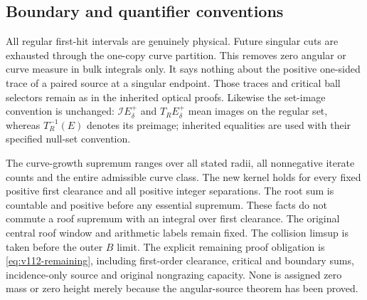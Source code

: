 \subsection*{Boundary and quantifier conventions}
All regular first-hit intervals are genuinely physical. Future
singular cuts are exhausted through the one-copy curve partition.
This removes zero angular or curve measure in bulk integrals only.
It says nothing about the positive one-sided trace of a paired
source at a singular endpoint. Those traces and critical ball
selectors remain as in the inherited optical proofs. Likewise the
set-image convention is unchanged: $\mathcal I E_\delta^+$ and
$T_RE_\delta^+$ mean images on the regular set, whereas
$T_R^{-1}(E)$ denotes its preimage; inherited equalities are used
with their specified null-set convention.

The curve-growth supremum ranges over all stated radii, all
nonnegative iterate counts and the entire admissible curve class.
The new kernel holds for every fixed positive first clearance and
all positive integer separations. The root sum is countable and
positive before any essential supremum. These facts do not commute
a roof supremum with an integral over first clearance. The original
central roof window and arithmetic labels remain fixed. The
collision limsup is taken before the outer $B$ limit. The explicit
remaining proof obligation is \eqref{eq:v112-remaining}, including
first-order clearance, critical and boundary sums, incidence-only
source and original nongrazing capacity. None is assigned zero
mass or zero height merely because the angular-source theorem
has been proved.
